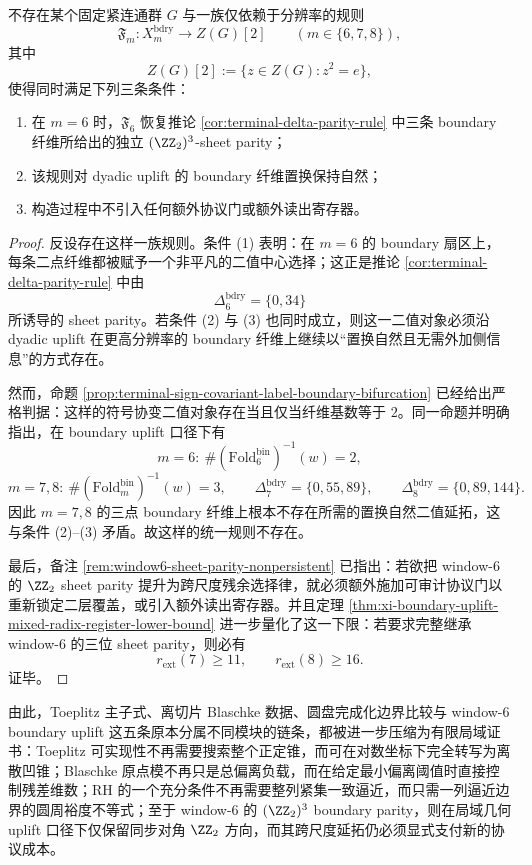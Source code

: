 \begin{theorem}\label{thm:xi-time-part65e-window6-no-gateless-z2-central-extension}
不存在某个固定紧连通群 \(G\) 与一族仅依赖于分辨率的规则
\[
\mathfrak F_m:X_m^{\mathrm{bdry}}\longrightarrow Z(G)[2]
\qquad(m\in\{6,7,8\}),
\]
其中
\[
Z(G)[2]:=\{z\in Z(G):z^2=e\},
\]
使得同时满足下列三条条件：
\begin{enumerate}
  \item 在 \(m=6\) 时，\(\mathfrak F_6\) 恢复推论 \ref{cor:terminal-delta-parity-rule} 中三条 boundary 纤维所给出的独立 \((\ZZ_2)^3\)-sheet parity；
  \item 该规则对 dyadic uplift 的 boundary 纤维置换保持自然；
  \item 构造过程中不引入任何额外协议门或额外读出寄存器。
\end{enumerate}
\end{theorem}
\begin{proof}
反设存在这样一族规则。条件 (1) 表明：在 \(m=6\) 的 boundary 扇区上，每条二点纤维都被赋予一个非平凡的二值中心选择；这正是推论 \ref{cor:terminal-delta-parity-rule} 中由
\[
\Delta_6^{\mathrm{bdry}}=\{0,34\}
\]
所诱导的 sheet parity。若条件 (2) 与 (3) 也同时成立，则这一二值对象必须沿 dyadic uplift 在更高分辨率的 boundary 纤维上继续以“置换自然且无需外加侧信息”的方式存在。

然而，命题 \ref{prop:terminal-sign-covariant-label-boundary-bifurcation} 已经给出严格判据：这样的符号协变二值对象存在当且仅当纤维基数等于 \(2\)。同一命题并明确指出，在 boundary uplift 口径下有
\[
m=6:\ \#(\mathrm{Fold}^{\mathrm{bin}}_6)^{-1}(w)=2,
\]
\[
m=7,8:\ \#(\mathrm{Fold}^{\mathrm{bin}}_m)^{-1}(w)=3,
\qquad
\Delta_7^{\mathrm{bdry}}=\{0,55,89\},
\qquad
\Delta_8^{\mathrm{bdry}}=\{0,89,144\}.
\]
因此 \(m=7,8\) 的三点 boundary 纤维上根本不存在所需的置换自然二值延拓，这与条件 (2)--(3) 矛盾。故这样的统一规则不存在。

最后，备注 \ref{rem:window6-sheet-parity-nonpersistent} 已指出：若欲把 window-\(6\) 的 \(\ZZ_2\) sheet parity 提升为跨尺度残余选择律，就必须额外施加可审计协议门以重新锁定二层覆盖，或引入额外读出寄存器。并且定理 \ref{thm:xi-boundary-uplift-mixed-radix-register-lower-bound} 进一步量化了这一下限：若要求完整继承 window-\(6\) 的三位 sheet parity，则必有
\[
r_{\mathrm{ext}}(7)\ge 11,
\qquad
r_{\mathrm{ext}}(8)\ge 16.
\]
证毕。
\end{proof}

\noindent
由此，Toeplitz 主子式、离切片 Blaschke 数据、圆盘完成化边界比较与 window-\(6\) boundary uplift 这五条原本分属不同模块的链条，都被进一步压缩为有限局域证书：Toeplitz 可实现性不再需要搜索整个正定锥，而可在对数坐标下完全转写为离散凹锥；Blaschke 原点模不再只是总偏离负载，而在给定最小偏离阈值时直接控制残差维数；RH 的一个充分条件不再需要整列紧集一致逼近，而只需一列逼近边界的圆周裕度不等式；至于 window-\(6\) 的 \((\ZZ_2)^3\) boundary parity，则在局域几何 uplift 口径下仅保留同步对角 \(\ZZ_2\) 方向，而其跨尺度延拓仍必须显式支付新的协议成本。

\endinput
